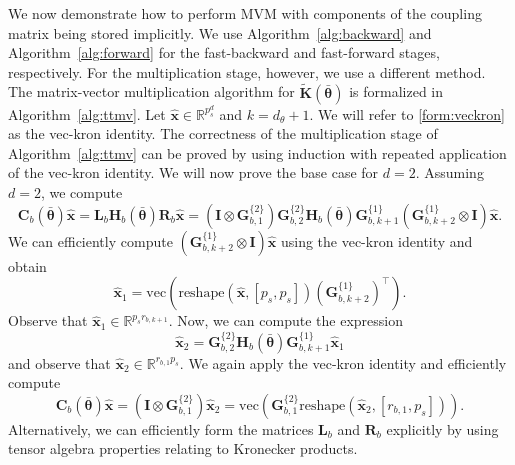 \documentclass[final,3p,times]{elsarticle}
\renewcommand{\vec}[1]{\boldsymbol{#1}}
\newcommand{\vech}[1]{\widehat{\boldsymbol{#1}}}
\newcommand{\mat}[1]{\boldsymbol{#1}}
\newcommand{\R}{\mathbb{R}}
\newcommand{\mathat}[1]{\widetilde{\boldsymbol{#1}}}
\begin{document}
We now demonstrate how to perform MVM with components of the coupling matrix being stored implicitly. We use Algorithm~\ref{alg:backward} and Algorithm~\ref{alg:forward} for the fast-backward and fast-forward stages, respectively. For the multiplication stage, however, we use a different method. The matrix-vector multiplication algorithm for $\mathat{K}(\bar{\vec{\theta}})$ is formalized in Algorithm~\ref{alg:ttmv}. Let $\vech{x} \in \R^{p_s^{d}}$ and $k = d_{\theta} + 1$. We will refer to \eqref{form:veckron} as the vec-kron identity. The correctness of the multiplication stage of Algorithm~\ref{alg:ttmv} can be proved by using induction with repeated application of the vec-kron identity. We will now prove the base case for $d = 2$. Assuming $d = 2$, we compute
\[
\mat{C}_{b}(\bar{\vec{\theta}})\vech{x} 
= \mat{L}_{b}\mat{H}_{b}(\bar{\vec{\theta}})\mat{R}_{b}\vech{x} 
= (\mat{I} \otimes \mat{G}_{b, 1}^{\{2\}})\mat{G}_{b,2}^{\{2\}}\mat{H}_{b}(\bar{\vec{\theta}})
\mat{G}_{b, k + 1}^{\{1\}}(\mat{G}_{b, k +2}^{\{1\}} \otimes \mat{I})\vech{x}.
\]
We can efficiently compute $(\mat{G}_{b, k +2}^{\{1\}} \otimes \mat{I})\vech{x}$ using the vec-kron identity and obtain
\[
\vech{x}_1 = \text{vec}\!\left(\text{reshape}(\vech{x}, [p_s, p_s])(\mat{G}_{b, k+2}^{\{1\}})^{\top}\right).
\]
Observe that $\vech{x}_1 \in \R^{p_s r_{b, k+1}}$. Now, we can compute the expression
\[
\vech{x}_{2} = \mat{G}_{b,2}^{\{2\}}\mat{H}_{b}(\bar{\vec{\theta}})\mat{G}_{b, k + 1}^{\{1\}}\vech{x}_1
\]
and observe that $\vech{x}_{2} \in \R^{r_{b, 1}p_s}$. We again apply the vec-kron identity and efficiently compute
\[
\mat{C}_{b}(\bar{\vec{\theta}})\vech{x} 
= (\mat{I} \otimes \mat{G}_{b, 1}^{\{2\}})\vech{x}_{2} 
= \text{vec}\!\left(\mat{G}_{b,1}^{\{2\}}\text{reshape}(\vech{x}_2, [r_{b,1}, p_s])\right).
\]
Alternatively, we can  efficiently form the matrices $\mat{L}_{b}$ and $\mat{R}_{b}$ explicitly by using tensor algebra properties relating to Kronecker products.  

%
%
\end{document}
